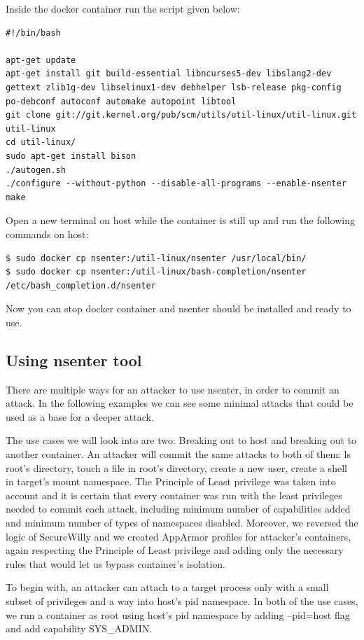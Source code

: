 Inside the docker container run the script given below:
\begin{lstlisting}[style=bashscript, caption={Script to run inside docker container nsenter}]
#!/bin/bash

apt-get update
apt-get install git build-essential libncurses5-dev libslang2-dev gettext zlib1g-dev libselinux1-dev debhelper lsb-release pkg-config po-debconf autoconf automake autopoint libtool
git clone git://git.kernel.org/pub/scm/utils/util-linux/util-linux.git util-linux
cd util-linux/
sudo apt-get install bison
./autogen.sh
./configure --without-python --disable-all-programs --enable-nsenter
make
\end{lstlisting}

Open a new terminal on host while the container is still up and run the following commands on host:

\begin{lstlisting}[style=terminal]
$ sudo docker cp nsenter:/util-linux/nsenter /usr/local/bin/
$ sudo docker cp nsenter:/util-linux/bash-completion/nsenter /etc/bash_completion.d/nsenter
\end{lstlisting}

Now you can stop docker container and nsenter should be installed and ready to use.

\subsection{Using nsenter tool}
There are multiple ways for an attacker to use nsenter, in order to commit an attack. In the following examples we can see some minimal attacks that could be used as a base for a deeper attack.

The use cases we will look into are two: Breaking out to host and breaking out to another container. An attacker will commit the same attacks to both of them: ls root's directory, touch a file in root's directory, create a new user, create a shell in target's mount namespace.
The Principle of Least privilege was taken into account and it is certain that every container was run with the least privileges needed to commit each attack, including minimum number of capabilities added and minimum number of types of namespaces disabled.
Moreover, we reversed the logic of SecureWilly and we created AppArmor profiles for attacker's containers, again respecting the Principle of Least privilege and adding only the necessary rules that would let us bypass container's isolation. 

To begin with, an attacker can attach to a target process only with a small subset of privileges and a way into host's pid namespace. In both of the use cases, we run a container as root using host's pid namespace by adding --pid=host flag and add capability SYS\_ADMIN.

